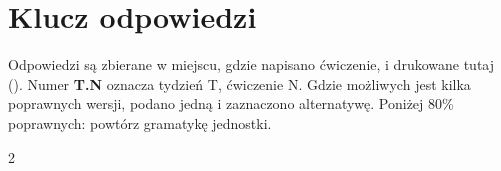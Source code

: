 \chapter{Klucz odpowiedzi}
Odpowiedzi są zbierane w miejscu, gdzie napisano ćwiczenie, i drukowane tutaj ().
Numer \textbf{T.N} oznacza tydzień T, ćwiczenie N. Gdzie możliwych jest kilka poprawnych wersji,
podano jedną i zaznaczono alternatywę. Poniżej 80\% poprawnych: powtórz gramatykę jednostki.
\begin{multicols}{2}\small\raggedright
\answerstore
\end{multicols}
